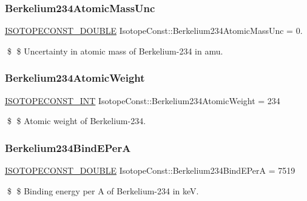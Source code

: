 \subsubsection{\texorpdfstring{Berkelium234\+Atomic\+Mass\+Unc}{Berkelium234AtomicMassUnc}}
{\footnotesize\ttfamily \mbox{\hyperlink{group___isotope_const-_macros_ga8f45a7272ce02c0b4c65c44636ed719a}{I\+S\+O\+T\+O\+P\+E\+C\+O\+N\+S\+T\+\_\+\+D\+O\+U\+B\+LE}} Isotope\+Const\+::\+Berkelium234\+Atomic\+Mass\+Unc = 0.}

\$ \$ Uncertainty in atomic mass of Berkelium-\/234 in amu. \mbox{\label{group___isotope_const-_berkelium-_bk234_ga4f4220653118d5240bea77af77573127}} 
\subsubsection{\texorpdfstring{Berkelium234\+Atomic\+Weight}{Berkelium234AtomicWeight}}
{\footnotesize\ttfamily \mbox{\hyperlink{group___isotope_const-_macros_ga5f18360b3e99483a35c32d789e62621c}{I\+S\+O\+T\+O\+P\+E\+C\+O\+N\+S\+T\+\_\+\+I\+NT}} Isotope\+Const\+::\+Berkelium234\+Atomic\+Weight = 234}

\$ \$ Atomic weight of Berkelium-\/234. \mbox{\label{group___isotope_const-_berkelium-_bk234_ga696e8d82c472d096ee9407093dbb076d}} 
\subsubsection{\texorpdfstring{Berkelium234\+Bind\+E\+PerA}{Berkelium234BindEPerA}}
{\footnotesize\ttfamily \mbox{\hyperlink{group___isotope_const-_macros_ga8f45a7272ce02c0b4c65c44636ed719a}{I\+S\+O\+T\+O\+P\+E\+C\+O\+N\+S\+T\+\_\+\+D\+O\+U\+B\+LE}} Isotope\+Const\+::\+Berkelium234\+Bind\+E\+PerA = 7519}

\$ \$ Binding energy per A of Berkelium-\/234 in keV. \mbox{\label{group___isotope_const-_berkelium-_bk234_ga7b85c693414fe58fb538039b0fbaf70b}} 
